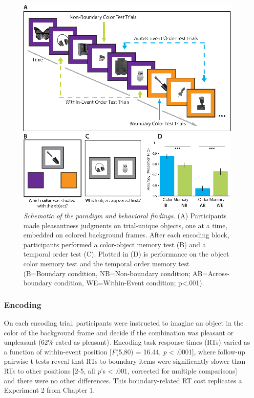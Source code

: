 \begin{figure}
  \centering
  \includegraphics[width=\textwidth]{figures/chapter2_figure1.eps}
  \caption[Schematic of the paradigm and behavioral findings]{\textit{Schematic of the paradigm and behavioral findings.} (A) Participants made pleasantness judgments on trial-unique objects, one at a time, embedded on colored background frames.  After each encoding block, participants performed a color-object memory test (B) and a temporal order test (C).  Plotted in (D) is performance on the object color memory test and the temporal order memory test (B=Boundary condition, NB=Non-boundary condition; AB=Across-boundary condition, WE=Within-Event condition; p<.001).}
  \label{chapter2_figure1}
\end{figure}

\subsubsection{Encoding}\label{encoding-1}

On each encoding trial, participants were instructed to imagine an
object in the color of the background frame and decide if the
combination was pleasant or unpleasant (62\% rated as pleasant).
Encoding task response times (RTs) varied as a function of within-event
position {[}\emph{F}(5,80) = 16.44, \emph{p} \textless{} .0001{]}, where
follow-up pairwise t-tests reveal that RTs to boundary items were
significantly slower than RTs to other positions {[}2-5, all \emph{p}'s
\textless{} .001, corrected for multiple comparisons{]} and there were
no other differences. This boundary-related RT cost replicates a
Experiment 2 from Chapter 1.

